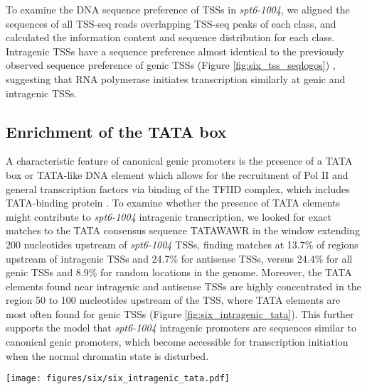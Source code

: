 To examine the DNA sequence preference of TSSs in \textit{spt6-1004}, we aligned the sequences of all TSS-seq reads overlapping TSS-seq peaks of each class, and calculated the information content and sequence distribution for each class.
Intragenic TSSs have a sequence preference almost identical to the previously observed sequence preference of genic TSSs (Figure \ref{fig:six_tss_seqlogos}) \citep{malabat2015}, suggesting that RNA polymerase initiates transcription similarly at genic and intragenic TSSs.

\subsection{Enrichment of the TATA box}

A characteristic feature of canonical genic promoters is the presence of a TATA box or TATA-like DNA element which allows for the recruitment of Pol II and general transcription factors via binding of the TFIID complex, which includes TATA-binding protein \citep{rhee2012}.
To examine whether the presence of TATA elements might contribute to \textit{spt6-1004} intragenic transcription, we looked for exact matches to the TATA consensus sequence TATAWAWR in the window extending 200 nucleotides upstream of \textit{spt6-1004} TSSs, finding matches at 13.7\% of regions upstream of intragenic TSSs and 24.7\% for antisense TSSs, versus 24.4\% for all genic TSSs and 8.9\% for random locations in the genome.
Moreover, the TATA elements found near intragenic and antisense TSSs are highly concentrated in the region 50 to 100 nucleotides upstream of the TSS, where TATA elements are most often found for genic TSSs (Figure \ref{fig:six_intragenic_tata}).
This further supports the model that \textit{spt6-1004} intragenic promoters are sequences similar to canonical genic promoters, which become accessible for transcription initiation when the normal chromatin state is disturbed.

\begin{SCfigure}[50][h]
    \centering
    \texttt{[image: figures/six/six\_intragenic\_tata.pdf]}
    \caption[Kernel density estimate of matches to a consensus TATA-box motif upstream of genic and \textit{spt6-1004}-induced intragenic TSSs.]{Scaled density of occurrences of exact matches to the motif TATAWAWR upstream of TSSs. For each category, a Gaussian kernel density estimate of the positions of motif occurrences is scaled by the number of motif occurrences per region.}
    \label{fig:six_intragenic_tata}
\end{SCfigure}

